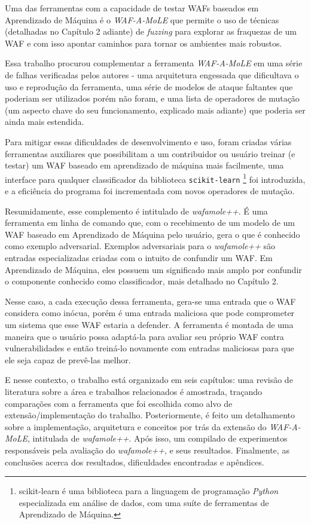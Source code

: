 Uma das ferramentas com a capacidade de testar WAFs baseados em Aprendizado de Máquina é o \textit{WAF-A-MoLE} \cite{valenza_waf--mole_2020} que permite o uso de técnicas (detalhadas no Capítulo 2 adiante) de \textit{fuzzing} \cite{fuzzing_book} para explorar as fraquezas de um WAF e com isso apontar caminhos para tornar os ambientes mais robustos.

Essa trabalho procurou complementar a ferramenta \textit{WAF-A-MoLE} em uma série de falhas verificadas pelos autores - uma arquitetura engessada que dificultava o uso e reprodução da ferramenta, uma série de modelos de ataque faltantes que poderiam ser utilizados porém não foram, e uma lista de operadores de mutação (um aspecto chave do seu funcionamento, explicado mais adiante) que poderia ser ainda mais estendida. 

Para mitigar essas dificuldades de desenvolvimento e uso, foram criadas várias ferramentas auxiliares que possibilitam a um contribuidor ou usuário treinar (e testar) um WAF baseado em aprendizado de máquina mais facilmente, uma interface para qualquer classificador da biblioteca \verb+scikit-learn+ \footnote{scikit-learn é uma biblioteca para a linguagem de programação \textit{Python} especializada em análise de dados, com uma suíte de ferramentas de Aprendizado de Máquina.} foi introduzida, e a eficiência do programa foi incrementada com novos operadores de mutação.

Resumidamente, esse complemento é intitulado de \textit{wafamole++}. É uma ferramenta em linha de comando que, com o recebimento de um modelo de um WAF baseado em Aprendizado de Máquina pelo usuário, gera o que é conhecido como exemplo adversarial. Exemplos adversariais para o \textit{wafamole++} são entradas especializadas criadas com o intuito de confundir um WAF. Em Aprendizado de Máquina, eles possuem um significado mais amplo por confundir o componente conhecido como classificador, mais detalhado no Capítulo 2.

Nesse caso, a cada execução dessa ferramenta, gera-se uma entrada que o WAF considera como inócua, porém é uma entrada maliciosa que pode comprometer um sistema que esse WAF estaria a defender. A ferramenta é montada de uma maneira que o usuário possa adaptá-la para avaliar seu próprio WAF contra vulnerabilidades e então treiná-lo novamente com entradas maliciosas para que ele seja capaz de prevê-las melhor.

E nesse contexto, o trabalho está organizado em seis capítulos: uma revisão de literatura sobre a área e trabalhos relacionados é amostrada, traçando comparações com a ferramenta que foi escolhida como alvo de extensão/implementação do trabalho. Posteriormente, é feito um detalhamento sobre a implementação, arquitetura e conceitos por trás da extensão do \textit{WAF-A-MoLE}, intitulada de \textit{wafamole++}. Após isso, um compilado de experimentos responsáveis pela avaliação do \textit{wafamole++}, e seus resultados. Finalmente, as conclusões acerca dos resultados, dificuldades encontradas e apêndices.

\bigskip
